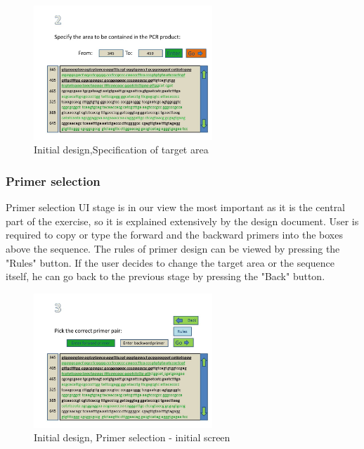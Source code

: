 \begin{figure}[h]
  \begin{center}
	\includegraphics[width=0.6\textwidth]{./images/UiDes/Slide2.jpg}
    \caption{
      \label{fig:UiDes:slide2}
      Initial design,Specification of target area
    }
  \end{center}
\end{figure}

\subsubsection{Primer selection}
Primer selection UI stage is in our view the most important as it is the central part of the exercise, so it is explained extensively by the design document. User is required to copy or type the forward and the backward primers into the boxes above the sequence. The rules of primer design can be viewed by pressing the "Rules" button. If the user decides to change the target area or the sequence itself, he can go back to the previous stage by pressing the "Back" button. 

\begin{figure}[h]
  \begin{center}
	\includegraphics[width=0.6\textwidth]{./images/UiDes/Slide3.jpg}
    \caption{
      \label{fig:UiDes:slide3}
      Initial design, Primer selection - initial screen
    }
  \end{center}
\end{figure}



